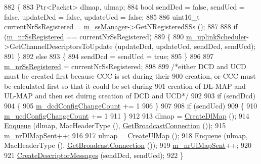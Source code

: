 \begin{DoxyCode}
882 \{
883   Ptr<Packet> dlmap, ulmap;
884   \textcolor{keywordtype}{bool} sendDcd = \textcolor{keyword}{false}, sendUcd = \textcolor{keyword}{false}, updateDcd = \textcolor{keyword}{false}, updateUcd = \textcolor{keyword}{false};
885 
886   uint16\_t currentNrSsRegistered = \hyperlink{classns3_1_1BaseStationNetDevice_a2365fd053319dda930081e661e6381a6}{m\_ssManager}->GetNRegisteredSSs ();
887 
888   \textcolor{keywordflow}{if} (\hyperlink{classns3_1_1BaseStationNetDevice_a831c0ed3e7c7c68d8c4021e73ebb4324}{m\_nrSsRegistered} == currentNrSsRegistered)
889     \{
890       \hyperlink{classns3_1_1BaseStationNetDevice_a14803d3fbd21b8777a8c7c7aeef8b8ba}{m\_uplinkScheduler}->GetChannelDescriptorsToUpdate (updateDcd, updateUcd, sendDcd, 
      sendUcd);
891     \}
892   \textcolor{keywordflow}{else}
893     \{
894       sendDcd = sendUcd = \textcolor{keyword}{true};
895     \}
896 
897   \hyperlink{classns3_1_1BaseStationNetDevice_a831c0ed3e7c7c68d8c4021e73ebb4324}{m\_nrSsRegistered} = currentNrSsRegistered;
898 
899   \textcolor{comment}{/*either DCD and UCD must be created first because CCC is set during their}
900 \textcolor{comment}{   creation, or CCC must be calculated first so that it could be set during}
901 \textcolor{comment}{   creation of DL-MAP and UL-MAP and then set duirng creation of DCD and UCD*/}
902 
903   \textcolor{keywordflow}{if} (sendDcd)
904     \{
905       \hyperlink{classns3_1_1BaseStationNetDevice_abcdaea98567567d67375bea8eb9cfb56}{m\_dcdConfigChangeCount} += 1 %
906     \}
907 
908   \textcolor{keywordflow}{if} (sendUcd)
909     \{
910       \hyperlink{classns3_1_1BaseStationNetDevice_a415c7021411c7acc8f3945acd59a9537}{m\_ucdConfigChangeCount} += 1 %
911     \}
912 
913   dlmap = \hyperlink{classns3_1_1BaseStationNetDevice_ab03962233fca4f8e6581c87ce34b8170}{CreateDlMap} ();
914   \hyperlink{classns3_1_1BaseStationNetDevice_a3c3e517ac4a08682411ed4fa0c97c037}{Enqueue} (dlmap, MacHeaderType (), \hyperlink{classns3_1_1WimaxNetDevice_a11d2c7bbd695e2c845a821ec15baa2aa}{GetBroadcastConnection} ());
915   \hyperlink{classns3_1_1BaseStationNetDevice_aeaa500ee5b23ee336f2d45af5c8db4da}{m\_nrDlMapSent}++;
916 
917   ulmap = \hyperlink{classns3_1_1BaseStationNetDevice_a73d0eb6a57169fc627126d2e37de9f20}{CreateUlMap} ();
918   \hyperlink{classns3_1_1BaseStationNetDevice_a3c3e517ac4a08682411ed4fa0c97c037}{Enqueue} (ulmap, MacHeaderType (), \hyperlink{classns3_1_1WimaxNetDevice_a11d2c7bbd695e2c845a821ec15baa2aa}{GetBroadcastConnection} ());
919   \hyperlink{classns3_1_1BaseStationNetDevice_a00961c496b6d4433e94b417bd86bc241}{m\_nrUlMapSent}++;
920 
921   \hyperlink{classns3_1_1BaseStationNetDevice_a1f5099c76f920d64a0bd0fba2f9cccff}{CreateDescriptorMessages} (sendDcd, sendUcd);
922 \}
\end{DoxyCode}


